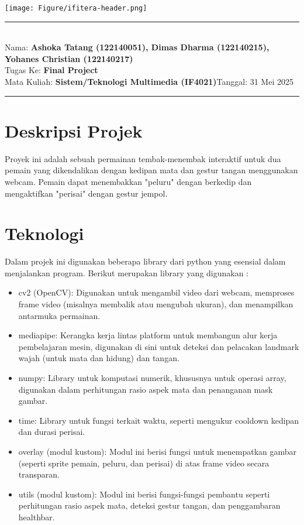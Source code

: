 \documentclass[11pt,a4paper]{article}
\newcommand{\student}{\textbf{Ashoka Tatang (122140051), Dimas Dharma (122140215), Yohanes Christian (122140217)}}
\newcommand{\course}{\textbf{Sistem/Teknologi Multimedia (IF4021)}}
\newcommand{\assignment}{\textbf{Final Project}}
\begin{document}
\thispagestyle{empty}
\begin{center}
	\texttt{[image: Figure/ifitera-header.png]}
	\vspace{0.1cm}
\end{center}
\noindent
\rule{17cm}{0.2cm}\\[0.3cm]
Nama: \student \hfill \\ Tugas Ke: \assignment \\[0.1cm]
Mata Kuliah: \course \hfill Tanggal: 31 Mei 2025 \\
\rule{17cm}{0.05cm}
\vspace{0.1cm}



\section{Deskripsi Projek}
Proyek ini adalah sebuah permainan tembak-menembak interaktif untuk dua pemain yang dikendalikan dengan kedipan mata dan gestur tangan menggunakan webcam. Pemain dapat menembakkan "peluru" dengan berkedip dan mengaktifkan "perisai" dengan gestur jempol.

\section{Teknologi}
Dalam projek ini digunakan beberapa library dari python yang esensial dalam menjalankan program. Berikut merupakan library yang digunakan :
\begin{itemize}
    \item cv2 (OpenCV): Digunakan untuk mengambil video dari webcam, memproses frame video (misalnya membalik atau mengubah ukuran), dan menampilkan antarmuka permainan.
    \item mediapipe: Kerangka kerja lintas platform untuk membangun alur kerja pembelajaran mesin, digunakan di sini untuk deteksi dan pelacakan landmark wajah (untuk mata dan hidung) dan tangan.
    \item numpy: Library untuk komputasi numerik, khususnya untuk operasi array, digunakan dalam perhitungan rasio aspek mata dan penanganan mask gambar.
    \item time: Library untuk fungsi terkait waktu, seperti mengukur cooldown kedipan dan durasi perisai.
    \item overlay (modul kustom): Modul ini berisi fungsi untuk menempatkan gambar (seperti sprite pemain, peluru, dan perisai) di atas frame video secara transparan.
    \item utils (modul kustom): Modul ini berisi fungsi-fungsi pembantu seperti perhitungan rasio aspek mata, deteksi gestur tangan, dan penggambaran healthbar.
\end{itemize}
\end{document}
